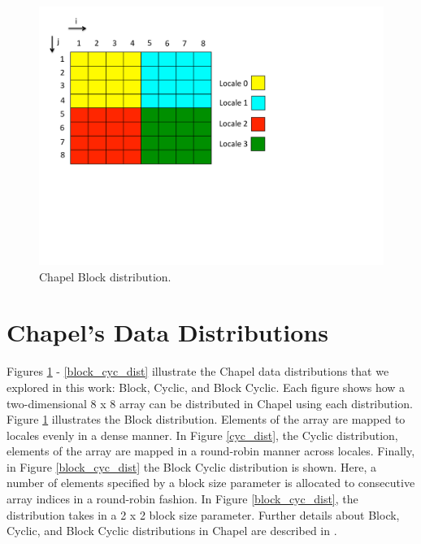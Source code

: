 \begin{figure}
	\begin{center}
	\includegraphics[scale=0.55]{./Figures/block_dist}
	\caption{Chapel Block distribution.}
	\label{block_dist}
	\end{center}
\end{figure}

\section{Chapel's Data Distributions}\label{sec:data_distributions} 

Figures \ref{block_dist} - \ref{block_cyc_dist} illustrate the Chapel data distributions that we explored in this work: Block, Cyclic, and Block Cyclic. Each figure shows how a two-dimensional 8 x 8 array can be distributed in Chapel using each distribution. Figure \ref{block_dist} illustrates the Block distribution. Elements of the array are mapped to locales evenly in a dense manner. In Figure \ref{cyc_dist}, the Cyclic distribution, elements of the array are mapped in a round-robin manner across locales. Finally, in Figure \ref{block_cyc_dist} the Block Cyclic distribution is shown. Here, a number of elements specified by a block size parameter is allocated to consecutive array indices in a round-robin fashion. In Figure \ref{block_cyc_dist}, the distribution takes in a 2 x 2 block size parameter. Further details about Block, Cyclic, and Block Cyclic distributions in Chapel are described in \cite{distributions}.

